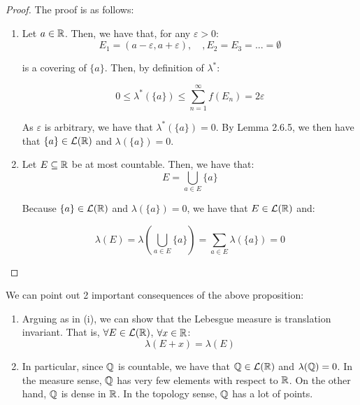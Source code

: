 \begin{proof}
    The proof is as follows:
    \begin{enumerate}[label=(\roman*)]
        \item Let $a \in \mathbb{R}$. Then, we have that, for any $\varepsilon > 0$:
        $$E_1 = (a - \varepsilon, a + \varepsilon), \quad, E_2 = E_3 = ... = \emptyset$$

        is a covering of $\{a\}$. Then, by definition of $\lambda^{*}$:

        $$0 \leq \lambda^{*}(\{a\}) \leq \sum_{n=1}^{\infty} f(E_n) = 2 \varepsilon$$

        As $\varepsilon$ is arbitrary, we have that $\lambda^{*}(\{a\}) = 0$. By Lemma 2.6.5, we then 
        have that $\{a\} \in \mathcal{L}(\mathbb{R})$ and $\lambda(\{a\}) = 0$.

        \item Let $E \subseteq \mathbb{R}$ be at most countable. Then, we have that:
        $$E = \bigcup_{a \in E} \{a\}$$

        Because $\{a\} \in \mathcal{L}(\mathbb{R})$ and $\lambda(\{a\}) = 0$, we have that $E \in \mathcal{L}(\mathbb{R})$ and:

        $$\lambda(E) = \lambda\left( \bigcup_{a \in E} \{a\} \right) = \sum_{a \in E} \lambda(\{a\}) = 0$$

    \end{enumerate}
\end{proof}

\begin{fremark}
    We can point out 2 important consequences of the above proposition:
    \vspace{1em}

    \begin{enumerate}
        \item Arguing as in (i), we can show that the Lebesgue measure is translation invariant.
        That is, $\forall E \in \mathcal{L}(\mathbb{R})$, $\forall x \in \mathbb{R}$:
        $$\lambda(E + x) = \lambda(E)$$

        \item In particular, since $\mathbb{Q}$ is countable, we have that $\mathbb{Q} \in \mathcal{L}(\mathbb{R})$ and $\lambda(\mathbb{Q}) = 0$.
        In the measure sense, $\mathbb{Q}$ has very few elements with respect to $\mathbb{R}$. On the other hand,
        $\mathbb{Q}$ is dense in $\mathbb{R}$. In the topology sense, $\mathbb{Q}$ has a lot of points.

    \end{enumerate}
\end{fremark}

\vspace{1em}

